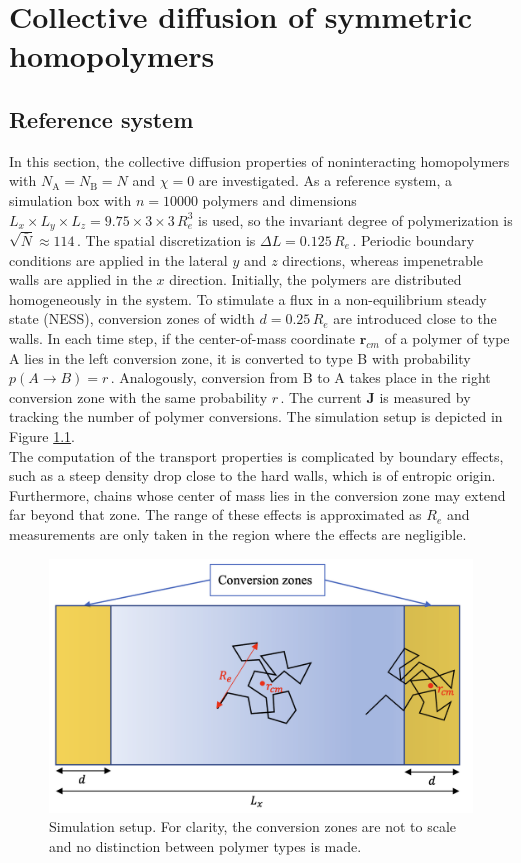 \documentclass[bachelor,       %
               twoside,        %
               BCOR10mm,       %
               ngerman, english %
               ]{GAUBM}
\begin{document}
\chapter{Collective diffusion of symmetric homopolymers}
\label{chap:colldiff}

\section{Reference system}

In this section, the collective diffusion properties of noninteracting homopolymers with $N_\mathrm A=N_\mathrm B=N$ and $\chi=0$ are investigated. As a reference system, a simulation box with $n=10000$ polymers and dimensions $L_x\times L_y\times L_z=9.75\times3\times3\,R_e^3$ is used, so the invariant degree of polymerization is $\sqrt{\bar{N}}\approx 114\,$. The spatial discretization is $\Delta L=0.125\,R_e\,$.  Periodic boundary conditions are applied in the lateral $y$ and $z$ directions, whereas impenetrable walls are applied in the $x$ direction. Initially, the polymers are distributed homogeneously in the system. To stimulate a flux in a non-equilibrium steady state (NESS), conversion zones of width $d=0.25\,R_e$ are introduced close to the walls. In each time step, if the center-of-mass coordinate $\mathbf r_{cm}$ of a polymer of type A lies in the left conversion zone, it is converted to type B with probability $p(A\rightarrow B)=r\,$. Analogously, conversion from B to A takes place in the right conversion zone with the same probability $r\,$. The current $\mathbf J$ is measured by tracking the number of polymer conversions. The simulation setup is depicted in Figure \ref{fig:simulation_box}. \\
The computation of the transport properties is complicated by boundary effects, such as a steep density drop close to the hard walls, which is of entropic origin. Furthermore, chains whose center of mass lies in the conversion zone may extend far beyond that zone. The range of these effects is approximated as $R_e$ and measurements are only taken in the region where the effects are negligible. 


\begin{figure}[h]
  \centering
  \includegraphics[width=0.7\linewidth]{figures/simulation_box.png}
  \caption{Simulation setup. For clarity, the conversion zones are not to scale and no distinction between polymer types is made.}
  \label{fig:simulation_box}
\end{figure}
\end{document}
